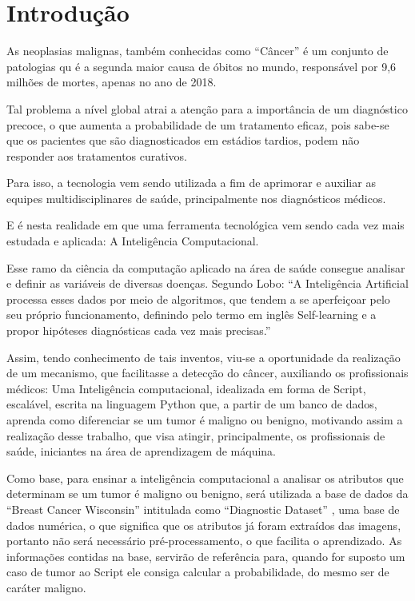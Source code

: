 \chapter{Introdução}
\label{chapter:introducao}

As neoplasias malignas, também conhecidas como “Câncer” é um conjunto de patologias qu é a segunda maior causa de óbitos no mundo,
responsável por 9,6 milhões de mortes, apenas no ano de 2018. \cite{ESTATISTICACANCER}

Tal problema a nível global atrai a atenção para a importância de um diagnóstico precoce,
o que aumenta a probabilidade de um tratamento eficaz, pois sabe-se que os pacientes que são diagnosticados em estádios tardios,
podem não responder aos tratamentos curativos.

Para isso, a tecnologia vem sendo utilizada a fim de aprimorar e auxiliar as equipes multidisciplinares de saúde,
principalmente nos diagnósticos médicos.

E é nesta realidade em que uma ferramenta tecnológica vem sendo cada vez mais estudada e aplicada:
A Inteligência Computacional.

Esse ramo da ciência da computação aplicado na área de saúde consegue analisar e definir as variáveis de diversas doenças.
Segundo Lobo: “A Inteligência Artificial processa esses dados por meio de algoritmos,
que tendem a se aperfeiçoar pelo seu próprio funcionamento,
definindo pelo termo em inglês Self-learning e a propor hipóteses diagnósticas cada vez mais precisas.”
\cite{IAEMSAUDE}

Assim, tendo conhecimento de tais inventos, viu-se a oportunidade da realização de um mecanismo,
que facilitasse a detecção do câncer, auxiliando os profissionais médicos:
Uma Inteligência computacional, idealizada em forma de Script, escalável, escrita na linguagem Python que,
a partir de um banco de dados, aprenda como diferenciar se um tumor é maligno ou benigno,
motivando assim a realização desse trabalho, que visa atingir, principalmente, os profissionais de saúde,
iniciantes na área de aprendizagem de máquina.

Como base, para ensinar a inteligência computacional a analisar os atributos que determinam se um tumor é maligno ou benigno,
será utilizada a base de dados da “Breast Cancer Wisconsin” intitulada como “Diagnostic Dataset” \cite{BREASTCANCER},
uma base de dados numérica, o que significa que os atributos já foram extraídos das imagens, portanto não será necessário pré-processamento,
o que facilita o aprendizado.
As informações contidas na base,
servirão de referência para, quando for suposto um caso de tumor ao Script ele consiga calcular a probabilidade,
do mesmo ser de caráter maligno.

